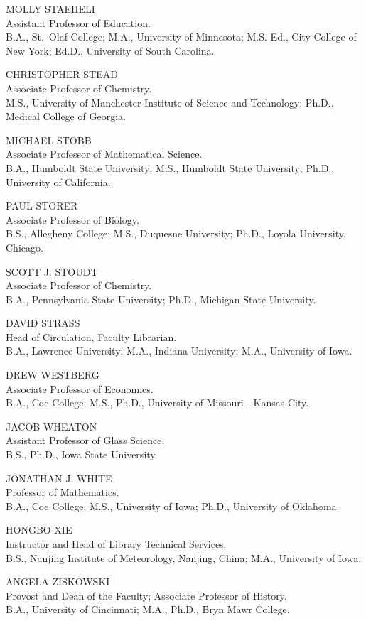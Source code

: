 \documentclass[
  letterpaper,
]{scrbook}
\begin{document}
MOLLY STAEHELI\\
Assistant Professor of Education.\\
B.A., St.~Olaf College; M.A., University of Minnesota; M.S. Ed., City
College of New York; Ed.D., University of South Carolina.

CHRISTOPHER STEAD\\
Associate Professor of Chemistry.\\
M.S., University of Manchester Institute of Science and Technology;
Ph.D., Medical College of Georgia.

MICHAEL STOBB\\
Associate Professor of Mathematical Science.\\
B.A., Humboldt State University; M.S., Humboldt State University; Ph.D.,
University of California.

PAUL STORER\\
Associate Professor of Biology.\\
B.S., Allegheny College; M.S., Duquesne University; Ph.D., Loyola
University, Chicago.

SCOTT J. STOUDT\\
Associate Professor of Chemistry.\\
B.A., Pennsylvania State University; Ph.D., Michigan State University.

DAVID STRASS\\
Head of Circulation, Faculty Librarian.\\
B.A., Lawrence University; M.A., Indiana University; M.A., University of
Iowa.

DREW WESTBERG\\
Associate Professor of Economics.\\
B.A., Coe College; M.S., Ph.D., University of Missouri - Kansas City.

JACOB WHEATON\\
Assistant Professor of Glass Science.\\
B.S., Ph.D., Iowa State University.

JONATHAN J. WHITE\\
Professor of Mathematics.\\
B.A., Coe College; M.S., University of Iowa; Ph.D., University of
Oklahoma.

HONGBO XIE\\
Instructor and Head of Library Technical Services.\\
B.S., Nanjing Institute of Meteorology, Nanjing, China; M.A., University
of Iowa.

ANGELA ZISKOWSKI\\
Provost and Dean of the Faculty; Associate Professor of History.\\
B.A., University of Cincinnati; M.A., Ph.D., Bryn Mawr College.
\end{document}

